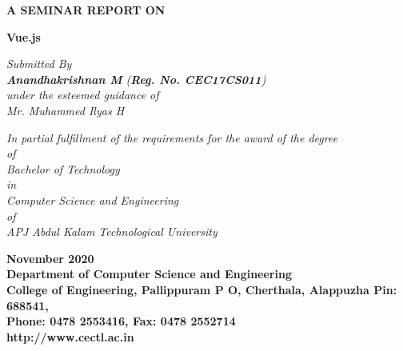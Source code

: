 \documentclass[12pt,a4paper,oneside]{report}
\begin{document}
\begin{titlepage}
\begin{center}

\large{\textbf{A SEMINAR REPORT ON}}\\
\begin{singlespace}
\LARGE{\textbf{Vue.js}}\\
\end{singlespace}


\Large{\textit{Submitted By }}\\
\Large{\textit{\textbf{Anandhakrishnan M}     (\textbf{Reg. No. CEC17CS011})}}\\
\Large{\textit{\textit{under the esteemed guidance of}}}\\
\Large{\textit{Mr. Muhammed Ilyas H}}\\
\begin{singlespace}
\large{\textit{In partial fulfillment of the requirements for the award of the degree}\\
\large{ \textit{of}}\\
\large{\textit{Bachelor of Technology} }\\
\large{\textit{in}}\\
\large{\textit{Computer Science and Engineering}}\\
\large{\textit{of}}\\
\large{\textit{APJ Abdul Kalam Technological University}}}\\
\end{singlespace}
\begin{figure}[h]
\begin{center}
\end{center}
\end{figure}
\begin{singlespace}

\Large{\textbf{November 2020\\Department of Computer Science and Engineering\\College of Engineering, Pallippuram P O, Cherthala, Alappuzha Pin: 688541, \\Phone: 0478 2553416, Fax: 0478 2552714\\http://www.cectl.ac.in}}
\end{singlespace}
\end{center}
\end{titlepage}
\end{document}
